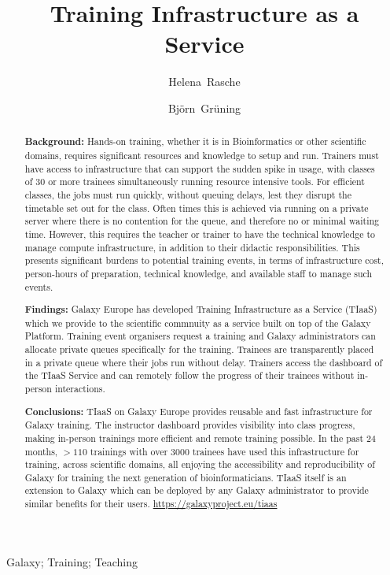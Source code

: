 \documentclass[a4paper,num-refs]{oup-contemporary}
\title{Training Infrastructure as a Service}
\author[1,\authfn{1},\authfn{2}]{Helena~Rasche}
\author[1,\authfn{2}]{Bj\"orn~Gr\"uning}
\affil[1]{Bioinformatics Group, Department of Computer Science, University of Freiburg, 79110 Freiburg im Breisgau, Germany}
\begin{document}
\begin{frontmatter}
\maketitle
\begin{abstract}
\textbf{Background:} Hands-on training, whether it is in Bioinformatics or other scientific domains, requires significant resources and knowledge to setup and run.
Trainers must have access to infrastructure that can support the sudden spike in usage, with classes of 30 or more trainees simultaneously running resource intensive tools.
For efficient classes, the jobs must run quickly, without queuing delays, lest they disrupt the timetable set out for the class. Often times this is achieved via running on a private server where there is no contention for the queue, and therefore no or minimal waiting time. However, this requires the teacher or trainer to have the technical knowledge to manage compute infrastructure, in addition to their didactic responsibilities. This presents significant burdens to potential training events, in terms of infrastructure cost, person-hours of preparation, technical knowledge, and available staff to manage such events.

\textbf{Findings:} Galaxy Europe has developed Training Infrastructure as a Service (TIaaS) which we provide to the scientific commnuity as a service built on top of the Galaxy Platform. Training event organisers request a training and Galaxy administrators can allocate private queues specifically for the training. Trainees are transparently placed in a private queue where their jobs run without delay. Trainers access the dashboard of the TIaaS Service and can remotely follow the progress of their trainees without in-person interactions.

\textbf{Conclusions:} TIaaS on Galaxy Europe provides reusable and fast infrastructure for Galaxy training. The instructor dashboard provides visibility into class progress, making in-person trainings more efficient and remote training possible. In the past 24 months, $>110$ trainings with over 3000 trainees have used this infrastructure for training, across scientific domains, all enjoying the accessibility and reproducibility of Galaxy for training the next generation of bioinformaticians. TIaaS itself is an extension to Galaxy which can be deployed by any Galaxy administrator to provide similar benefits for their users. \url{https://galaxyproject.eu/tiaas}
\end{abstract}

\begin{keywords}
Galaxy; Training; Teaching
\end{keywords}
\end{frontmatter}
\end{document}
